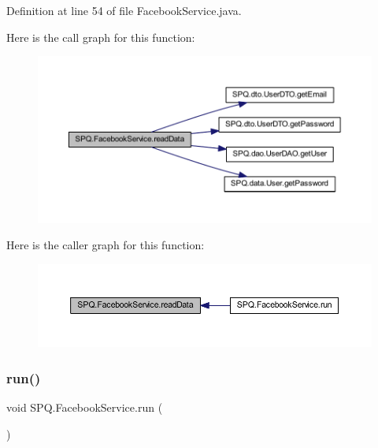 Definition at line 54 of file Facebook\+Service.\+java.

Here is the call graph for this function\+:\nopagebreak
\begin{figure}[H]
\begin{center}
\leavevmode
\includegraphics[width=350pt]{class_s_p_q_1_1_facebook_service_a087e3aab2d870149c0ef74f3adf75efa_cgraph}
\end{center}
\end{figure}
Here is the caller graph for this function\+:\nopagebreak
\begin{figure}[H]
\begin{center}
\leavevmode
\includegraphics[width=350pt]{class_s_p_q_1_1_facebook_service_a087e3aab2d870149c0ef74f3adf75efa_icgraph}
\end{center}
\end{figure}
\mbox{\label{class_s_p_q_1_1_facebook_service_a24a62bc6a32966419548314bc417abfb}} 
\subsubsection{\texorpdfstring{run()}{run()}}
{\footnotesize\ttfamily void S\+P\+Q.\+Facebook\+Service.\+run (\begin{DoxyParamCaption}{ }\end{DoxyParamCaption})}



